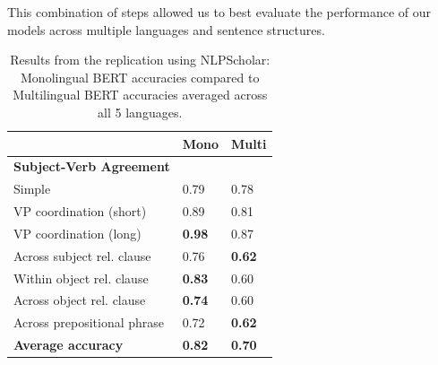 \documentclass[11pt]{article}
\begin{document}
\begin{itemize}
\end{itemize}

This combination of steps allowed us to best evaluate the performance of our models across multiple languages and sentence structures.

\begin{table}[h!]
\centering

\begin{tabular}{lll}
\hline
\textbf{ } & \textbf{Mono} & \textbf{Multi} \\ 
\hline
\textbf{Subject-Verb Agreement} & & \\
Simple & 0.79 & 0.78 \\
VP coordination (short) & 0.89 & 0.81 \\
VP coordination (long) & \textbf{0.98} & 0.87 \\
Across subject rel. clause & 0.76 & \textbf{0.62} \\
Within object rel. clause & \textbf{0.83} & 0.60 \\
Across object rel. clause & \textbf{0.74} & 0.60 \\
Across prepositional phrase & 0.72 & \textbf{0.62} \\
\hline
\textbf{Average accuracy} & \textbf{0.82} & \textbf{0.70} \\ 
\end{tabular}
\caption{\label{citation-guide}
Results from the replication using NLPScholar: Monolingual BERT accuracies compared to Multilingual BERT accuracies averaged across all 5 languages.
}
\label{tab:Table3}
\end{table}
\end{document}
